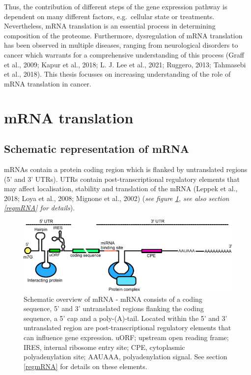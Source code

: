 \documentclass[12pt,openany]{book}
\begin{document}
Thus, the contribution of different steps of the gene expression pathway
is dependent on many different factors, e.g.~cellular state or
treatments. Nevertheless, mRNA translation is an essential process in
determining composition of the proteome. Furthermore, dysregulation of
mRNA translation has been observed in multiple diseases, ranging from
neurological disorders to cancer which warrants for a comprehensive
understanding of this process (Graff et al., 2009; Kapur et al., 2018;
L. J. Lee et al., 2021; Ruggero, 2013; Tahmasebi et al., 2018). This
thesis focusses on increasing understanding of the role of mRNA
translation in cancer. \newline
\section{mRNA translation} \subsection{Schematic representation of mRNA}
mRNAs contain a protein coding region which is flanked by untranslated
regions (5' and 3' UTRs). UTRs contain post-transcriptional regulatory
elements that may affect localisation, stability and translation of the
mRNA (Leppek et al., 2018; Loya et al., 2008; Mignone et al., 2002)
(\emph{see figure \ref{fig:UTRFeat}, see also section \ref{regmRNA} for
details}).

\begin{figure}[H]
  \includegraphics{./figures/UTRFeatures_2.pdf}
  \caption{ Schematic overview of mRNA - mRNA consists of a coding sequence, 5' and 3' untranslated regions flanking the coding sequence, a 5' cap and a poly-(A)-tail. Located within the 5' and 3' untranslated region are post-transcriptional regulatory elements that can influence gene expression. uORF; upstream open reading frame; IRES, internal ribosome entry site; CPE, cytoplasmic polyadenylation site; AAUAAA, polyadenylation signal. See section \ref{regmRNA} for details on these elements.
 \label{fig:UTRFeat}}
\end{figure}
\end{document}
